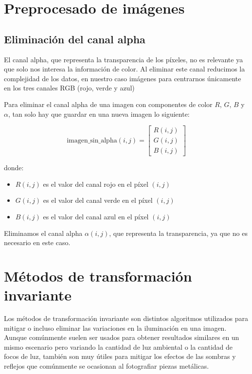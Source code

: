 

\section{Preprocesado de imágenes}\label{preprocesado}


\subsection{Eliminación del canal alpha}\label{eliminación-del-canal-alpha}

El canal alpha, que representa la transparencia de los píxeles, no es relevante ya que solo nos interesa la información de color. Al eliminar este canal reducimos la complejidad de los datos, en nuestro caso imágenes para centrarnos únicamente en los tres canales RGB (rojo, verde y azul)

Para eliminar el canal alpha de una imagen con componentes de color $R$, $G$, $B$ y $\alpha$, tan solo hay que guardar en una nueva imagen lo siguiente:

$$\text{imagen\_sin\_alpha}(i, j) = 
\begin{bmatrix} R(i, j) \\ G(i, j) \\ B(i, j)\end{bmatrix}$$

donde:

\begin{itemize}
  \item $R(i, j)$ es el valor del canal rojo en el píxel $(i, j)$
  \item $G(i, j)$ es el valor del canal verde en el píxel $(i, j)$
  \item $B(i, j)$ es el valor del canal azul en el píxel $(i, j)$
\end{itemize}

Eliminamos el canal alpha $\alpha(i, j)$, que representa la transparencia, ya que no es necesario en este caso.

\section{Métodos de transformación invariante}\label{metodos-de-transformación-invariante}

Los métodos de transformación invariante son distintos algoritmos utilizados para mitigar o incluso eliminar las variaciones en la iluminación en una imagen. Aunque comúnmente suelen ser usados para obtener resultados similares en un mismo escenario pero variando la cantidad de luz ambiental o la cantidad de focos de luz, también son muy útiles para mitigar los efectos de las sombras y reflejos que comúnmente se ocasionan al fotografiar piezas metálicas. 

